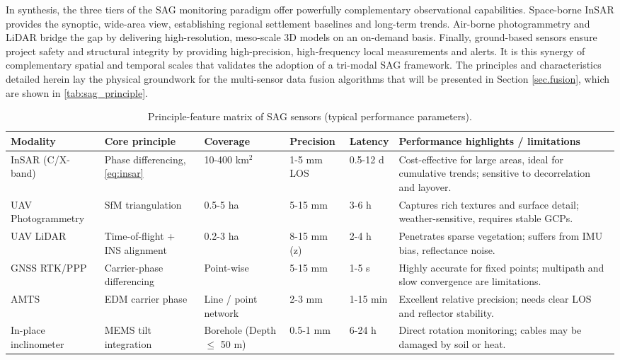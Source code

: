 \documentclass[preprint,11pt,authoryear,3p]{elsarticle}
\begin{document}
In synthesis, the three tiers of the SAG monitoring paradigm offer powerfully complementary observational capabilities. Space-borne InSAR provides the synoptic, wide-area view, establishing regional settlement baselines and long-term trends. Air-borne photogrammetry and LiDAR bridge the gap by delivering high-resolution, meso-scale 3D models on an on-demand basis. Finally, ground-based sensors ensure project safety and structural integrity by providing high-precision, high-frequency local measurements and alerts. It is this synergy of complementary spatial and temporal scales that validates the adoption of a tri-modal SAG framework. The principles and characteristics detailed herein lay the physical groundwork for the multi-sensor data fusion algorithms that will be presented in Section \ref{sec.fusion}, which are shown in \autoref{tab:sag_principle}.

\begin{landscape}
\begin{table}[htbp]
\centering\small
\caption{Principle-feature matrix of SAG sensors (typical performance parameters).}
\label{tab:sag_principle}
\begin{tabular}{@{}p{2.8cm}p{3cm}p{2.8cm}p{2.5cm}p{2.5cm}p{8cm}@{}}
\toprule 
\textbf{Modality} & \textbf{Core principle} & \textbf{Coverage} & \textbf{Precision} & \textbf{Latency} & \textbf{Performance highlights / limitations} \\
\midrule
InSAR (C/X-band) & Phase differencing, \autoref{eq:insar} & 10-400 km$^2$ & 1-5 mm LOS & 0.5-12 d & Cost-effective for large areas, ideal for cumulative trends; sensitive to decorrelation and layover. \\
UAV Photogrammetry & SfM triangulation & 0.5-5 ha & 5-15 mm & 3-6 h & Captures rich textures and surface detail; weather-sensitive, requires stable GCPs. \\
UAV LiDAR & Time-of-flight + INS alignment & 0.2-3 ha & 8-15 mm (z) & 2-4 h & Penetrates sparse vegetation; suffers from IMU bias, reflectance noise. \\
GNSS RTK/PPP & Carrier-phase differencing & Point-wise & 5-15 mm & 1-5 s & Highly accurate for fixed points; multipath and slow convergence are limitations. \\
AMTS & EDM carrier phase & Line / point network & 2-3 mm & 1-15 min & Excellent relative precision; needs clear LOS and reflector stability. \\
In-place inclinometer & MEMS tilt integration & Borehole (Depth $\le$ 50 m) & 0.5-1 mm & 6-24 h & Direct rotation monitoring; cables may be damaged by soil or heat. \\
\bottomrule
\end{tabular}
\end{table}
\end{landscape}
\end{document}

